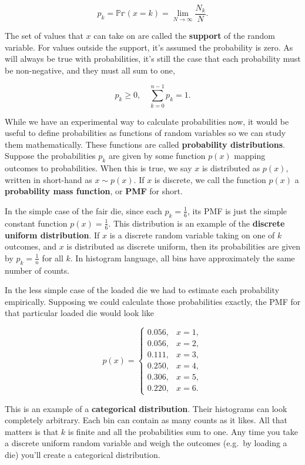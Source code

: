 \documentclass[
  letterpaper,
  DIV=11,
  numbers=noendperiod]{scrreprt}
\begin{document}
\[p_k = \mathbb{Pr}(x=k) = \lim_{N \rightarrow \infty} \frac{N_k}{N}.\]

The set of values that \(x\) can take on are called the \textbf{support}
of the random variable. For values outside the support, it's assumed the
probability is zero. As will always be true with probabilities, it's
still the case that each probability must be non-negative, and they must
all sum to one,

\[p_k \geq 0, \quad \sum_{k=0}^{n-1} p_k = 1.\]

While we have an experimental way to calculate probabilities now, it
would be useful to define probabilities as functions of random variables
so we can study them mathematically. These functions are called
\textbf{probability distributions}. Suppose the probabilities \(p_k\)
are given by some function \(p(x)\) mapping outcomes to probabilities.
When this is true, we say \(x\) is distributed as \(p(x)\), written in
short-hand as \(x \sim p(x)\). If \(x\) is discrete, we call the
function \(p(x)\) a \textbf{probability mass function}, or \textbf{PMF}
for short.

In the simple case of the fair die, since each \(p_k = \frac{1}{6}\),
its PMF is just the simple constant function \(p(x) = \frac{1}{6}\).
This distribution is an example of the \textbf{discrete uniform
distribution}. If \(x\) is a discrete random variable taking on one of
\(k\) outcomes, and \(x\) is distributed as discrete uniform, then its
probabilities are given by \(p_k = \frac{1}{n}\) for all \(k\). In
histogram language, all bins have approximately the same number of
counts.

In the less simple case of the loaded die we had to estimate each
probability empirically. Supposing we could calculate those
probabilities exactly, the PMF for that particular loaded die would look
like

\[
p(x) = 
\begin{cases}
0.056, & x = 1, \\
0.056, & x = 2, \\
0.111, & x = 3, \\
0.250, & x = 4, \\
0.306, & x = 5, \\
0.220, & x = 6.
\end{cases}
\]

This is an example of a \textbf{categorical distribution}. Their
histograms can look completely arbitrary. Each bin can contain as many
counts as it likes. All that matters is that \(k\) is finite and all the
probabilities sum to one. Any time you take a discrete uniform random
variable and weigh the outcomes (e.g.~by loading a die) you'll create a
categorical distribution.
\end{document}
